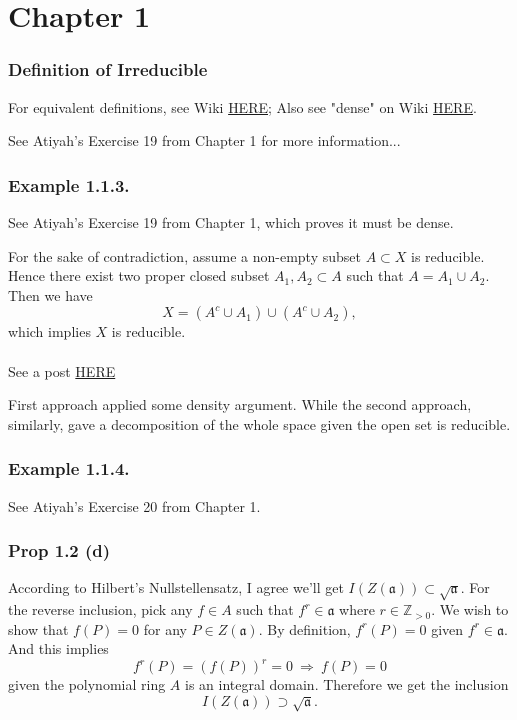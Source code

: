 \part{Chapter 1}

\section{Definition of Irreducible}

For equivalent definitions, see Wiki \href{https://en.wikipedia.org/wiki/Irreducible_component}{HERE};
Also see "dense" on Wiki \href{https://en.wikipedia.org/wiki/Dense_set}{HERE}.

See Atiyah's \cite{atiyah1994introduction} Exercise 19 from Chapter 1 for more information...

\section{Example 1.1.3.}
See Atiyah's \cite{atiyah1994introduction} Exercise 19 from Chapter 1, which proves it must be dense.

For the sake of contradiction, assume a non-empty subset $A\subset X$ is reducible. Hence there exist two proper closed subset $A_1,A_2\subset A$ such that $A=A_1\cup A_2$.
Then we have $$X=(A^c\cup A_1)\cup (A^c\cup A_2),$$ which implies $X$ is reducible. 
\subsection{}
See a post \href{https://math.stackexchange.com/questions/460074/an-open-subset-of-an-irreducible-set-is-dense}{HERE} 

First approach applied some density argument. While the second approach, similarly, gave a decomposition of the whole space given the open set is reducible.

\section{Example 1.1.4.}

See Atiyah's \cite{atiyah1994introduction} Exercise 20 from Chapter 1.

\section{Prop 1.2 (d)}

According to Hilbert's Nullstellensatz, I agree we'll get $I(Z(\mathfrak a))\subset \sqrt{\mathfrak a}$.
For the reverse inclusion, pick any $f\in A$ such that $f^r\in\mathfrak a$ where $r\in\mathbb Z_{>0}$. We wish to show that $f(P)=0$ for any $P\in Z(\mathfrak a)$. By definition, $f^r(P)=0$ given $f^r\in\mathfrak a$. And this implies $$f^r(P)=(f(P))^r=0 ~\Rightarrow~ f(P)=0$$ given the polynomial ring $A$ is an integral domain. Therefore we get the inclusion 
$$I(Z(\mathfrak a))\supset \sqrt{\mathfrak a}.$$

